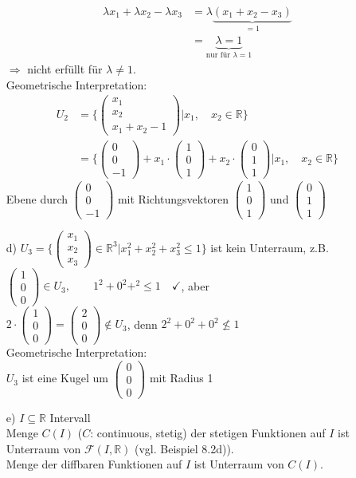\documentclass[12pt, titlepage]{article}
\newcommand{\R}{\mathds{R}}
\renewcommand{\vec}[1]{\left(\begin{array}{c}#1
	\end{array}\right)}
\renewcommand{\>}{\rightarrow}
\renewcommand{\*}{\cdot}
\begin{document}
\begin{itemize}
	\begin{align*}
		\lambda x_1+\lambda x_2-\lambda x_3&=\lambda\underbrace{(x_1+x_2-x_3)}_{=1}\\
		&=\underbrace{\lambda=1}_{\textrm{nur für }\lambda=1}
	\end{align*}
	$\Rightarrow$ nicht erfüllt für $\lambda\neq1$.\\
	Geometrische Interpretation:\\
	\begin{align*}
		U_2&=\{\vec{x_1\\x_2\\x_1+x_2-1}|x_1,\quad x_2\in\R\}\\
		&=\{\vec{0\\0\\-1}+x_1\*\vec{1\\0\\1}+x_2\*\vec{0\\1\\1}|x_1,\quad x_2\in\R\}
	\end{align*}
	Ebene durch $\vec{0\\0\\-1}$ mit Richtungsvektoren $\vec{1\\0\\1}$ und $\vec{0\\1\\1}$
	\item[d)] $U_3=\{\vec{x_1\\x_2\\x_3}\in\R^3|x_1^2+x_2^2+x_3^2\leq1\}$ ist kein Unterraum, z.B.\\
	$\vec{1\\0\\0}\in U_3,\qquad1^2+0^2+^2\leq1\quad\checkmark$, aber\\
	$2\*\vec{1\\0\\0}=\vec{2\\0\\0}\notin U_3$, denn $2^2+0^2+0^2\nleq1$\\
	Geometrische Interpretation:\\
	$U_3$ ist eine Kugel um $\vec{0\\0\\0}$ mit Radius 1
	\item[e)] $I\subseteq\R$ Intervall\\Menge $C(I)$ ($C$: continuous, stetig) der stetigen Funktionen auf $I$ ist Unterraum von $\mathcal{F}(I,\R)$ (vgl. Beispiel 8.2d)).\\
	Menge der diffbaren Funktionen auf $I$ ist Unterraum von $C(I)$.
	\end{itemize}
\end{document}
